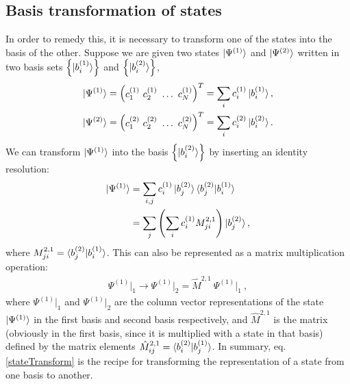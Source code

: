 \documentclass[reprint]{revtex4-2}
\begin{document}
\subsection{Basis transformation of states}
In order to remedy this, it is necessary to transform one of the states into the basis of the other. Suppose we are given two states \(\ket{\Psi^{(1)}}\) and \(\ket{\Psi^{(2)}}\) written in two basis sets \(\left\{ \ket{b^{(1)}_i}\right\} \) and \(\left\{ \ket{b^{(2)}_i}\right\} \),
\begin{equation}\begin{aligned}
	\ket{\Psi^{(1)}} = \begin{pmatrix} c_1^{(1)} ~ c_2^{(1)} ~ \ldots ~ c_N^{(1)} \end{pmatrix}^T = \sum_i c_i^{(1)} \ket{b_i^{(1)}},\\
	\ket{\Psi^{(2)}} = \begin{pmatrix} c_1^{(2)} ~ c_2^{(2)} ~ \ldots ~ c_N^{(2)} \end{pmatrix}^T = \sum_i c_i^{(2)} \ket{b_i^{(2)}}.
\end{aligned}\end{equation}
We can transform \(\ket{\Psi^{(1)}}\) into the basis \(\left\{ \ket{b^{(2)}_i}\right\} \) by inserting an identity resolution:
\begin{equation}\begin{aligned}
	\ket{\Psi^{(1)}} &= \sum_{i, j} c_i^{(1)} \ket{b_j^{(2)}}\braket{b_j^{(2)}|b_i^{(1)}} \\
					 &= \sum_{j} \left(\sum_i c_i^{(1)} M^{2, 1}_{ji} \right)\ket{b_j^{(2)}},
\end{aligned}\end{equation}
where \(M^{2, 1}_{ji} = \braket{b_j^{(2)}|b_i^{(1)}}\). This can also be represented as a matrix multiplication operation:
\begin{equation}\begin{aligned}\label{stateTransform}
	\Psi^{(1)}\vert_{1} \to \Psi^{(1)}\vert_{2} = \hat M^{2, 1}~\Psi^{(1)}\vert_{1}~,
\end{aligned}\end{equation}
where \(\Psi^{(1)}\vert_{1}\) and \(\Psi^{(1)}\vert_{2}\) are the column vector representations of the state \(\ket{\Psi^{(1)}}\) in the first basis and second basis respectively, and \(\hat M^{2, 1}\) is the matrix (obviously in the first basis, since it is multiplied with a state in that basis) defined by the matrix elements \(\hat M^{2, 1}_{ij} = \braket{b_i^{(2)} | b_j^{(1)}}\). In summary, eq.\ref{stateTransform} is the recipe for transforming the representation of a state from one basis to another.
	
\end{document}
